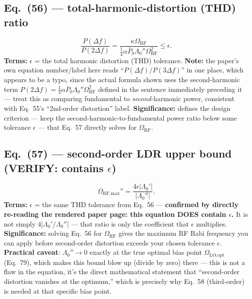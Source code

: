 \documentclass[11pt]{article}
\begin{document}
\subsection*{Eq.~(56) --- total-harmonic-distortion (THD) ratio}
\begin{equation}
\frac{P(\Delta f)}{P(2\Delta f)} = \frac{\kappa\Omega_\text{RF}}{\tfrac14\alpha\bar P_0\Lambda_0''\Omega_\text{RF}^2} \le \epsilon. \tag{56}
\end{equation}
\textbf{Terms:} $\epsilon$ = the total harmonic distortion (THD)
tolerance. \textbf{Note:} the paper's own equation number/label here
reads ``$P(\Delta f)/P(3\Delta f)$'' in one place, which appears to be a
typo, since the actual formula shown uses the second-harmonic term
$P(2\Delta f)=\frac14\alpha\bar P_0\Lambda_0''\Omega_\text{RF}^2$
defined in the sentence immediately preceding it --- treat this as
comparing fundamental to \emph{second}-harmonic power, consistent with
Eq.~55's ``2nd-order distortion'' label.
\textbf{Significance:} defines the design criterion --- keep the
second-harmonic-to-fundamental power ratio below some tolerance
$\epsilon$ --- that Eq.~57 directly solves for $\Omega_\text{RF}$.

\subsection*{Eq.~(57) --- second-order LDR upper bound (VERIFY: contains $\epsilon$)}
\begin{equation}
\Omega_\text{RF,max}'' = \frac{4\epsilon|\Lambda_0'|}{|\Lambda_0''|}. \tag{57}
\end{equation}
\textbf{Terms:} $\epsilon$ = the same THD tolerance from Eq.~56 ---
\textbf{confirmed by directly re-reading the rendered paper page: this
equation DOES contain $\epsilon$.} It is not simply
$4|\Lambda_0'/\Lambda_0''|$ --- that ratio is only the coefficient that
$\epsilon$ multiplies.
\textbf{Significance:} solving Eq.~56 for $\Omega_\text{RF}$ gives the
maximum RF Rabi frequency you can apply before second-order distortion
exceeds your chosen tolerance $\epsilon$. \textbf{Practical caveat}:
$\Lambda_0''\to0$ exactly at the true optimal bias point
$\Omega_\text{LO,opt}$ (Eq.~79), which makes this bound blow up
(divide by zero) there --- this is not a flaw in the equation, it's the
direct mathematical statement that ``second-order distortion vanishes
at the optimum,'' which is precisely why Eq.~58 (third-order) is needed
at that specific bias point.
\end{document}
